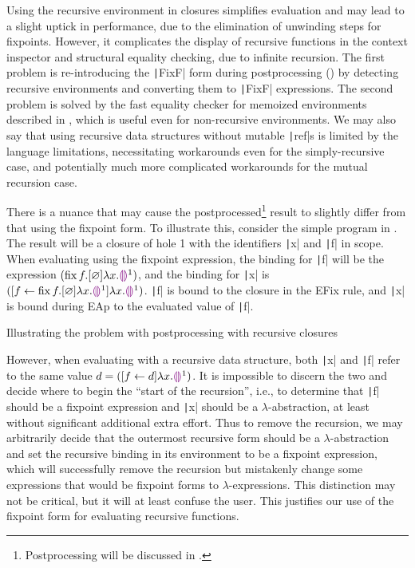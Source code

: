 Using the recursive environment in closures simplifies evaluation and may lead to a slight uptick in performance, due to the elimination of unwinding steps for fixpoints. However, it complicates the display of recursive functions in the context inspector and structural equality checking, due to infinite recursion. The first problem is re-introducing the \texttt|FixF| form during postprocessing () by detecting recursive environments and converting them to \texttt|FixF| expressions. The second problem is solved by the fast equality checker for memoized environments described in , which is useful even for non-recursive environments. We may also say that using recursive data structures without mutable \texttt|ref|s is limited by the language limitations, necessitating workarounds even for the simply-recursive case, and potentially much more complicated workarounds for the mutual recursion case.

There is a nuance that may cause the postprocessed\footnote{Postprocessing will be discussed in .} result to slightly differ from that using the fixpoint form. To illustrate this, consider the simple program in . The result will be a closure of hole 1 with the identifiers \texttt|x| and \texttt|f| in scope. When evaluating using the fixpoint expression, the binding for \texttt|f| will be the expression $(\operatorname{fix} f.[\varnothing]\lambda x.\textcolor{violet}{\llparenthesis}\textcolor{violet}{\rrparenthesis}^1)$, and the binding for \texttt|x| is $([f\leftarrow \operatorname{fix} f.[\varnothing]\lambda x.\textcolor{violet}{\llparenthesis}\textcolor{violet}{\rrparenthesis}^1]\lambda x.\textcolor{violet}{\llparenthesis}\textcolor{violet}{\rrparenthesis}^1)$. \texttt|f| is bound to the closure in the EFix rule, and \texttt|x| is bound during EAp to the evaluated value of \texttt|f|.

\begin{listing}
  \centering
  \caption{Illustrating the problem with postprocessing with recursive closures}
  \label{fig:rec-closures-issue}
\end{listing}

However, when evaluating with a recursive data structure, both \texttt|x| and \texttt|f| refer to the same value $d=([f\leftarrow d]\lambda x.\textcolor{violet}{\llparenthesis}\textcolor{violet}{\rrparenthesis}^1)$. It is impossible to discern the two and decide where to begin the ``start of the recursion'', i.e., to determine that \texttt|f| should be a fixpoint expression and \texttt|x| should be a $\lambda$-abstraction, at least without significant additional extra effort. Thus to remove the recursion, we may arbitrarily decide that the outermost recursive form should be a $\lambda$-abstraction and set the recursive binding in its environment to be a fixpoint expression, which will successfully remove the recursion but mistakenly change some expressions that would be fixpoint forms to $\lambda$-expressions. This distinction may not be critical, but it will at least confuse the user. This justifies our use of the fixpoint form for evaluating recursive functions.


